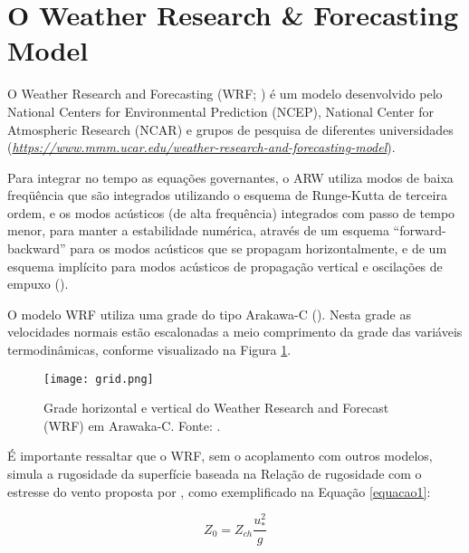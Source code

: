 
\section{O Weather Research \& Forecasting Model}
\bigskip

\noindent O Weather Research and Forecasting (WRF; \cite{Skamarock2008}) é um modelo desenvolvido pelo National Centers for Environmental Prediction (NCEP), National Center for Atmospheric Research (NCAR) e grupos de pesquisa de diferentes universidades (\textcolor{bleu_cite}{\href{https://www.mmm.ucar.edu/weather-research-and-forecasting-model}{\textit{https://www.mmm.ucar.edu/weather-research-and-forecasting-model}}}).
\bigskip

\noindent Para integrar no tempo as equações governantes, o ARW utiliza modos de baixa freqüência que são integrados utilizando o esquema de Runge-Kutta de terceira ordem, e os modos acústicos (de alta frequência) integrados com passo de tempo menor, para manter a estabilidade numérica, através de um esquema “forward-backward” para os modos acústicos que se propagam horizontalmente, e de um esquema implícito para modos acústicos de propagação vertical e oscilações de empuxo (\cite{Skamarock2008}).
\bigskip

\noindent O modelo WRF utiliza uma grade do tipo Arakawa-C (\cite{Arakawa1977}). Nesta grade as velocidades normais estão escalonadas a meio comprimento da grade das variáveis termodinâmicas, conforme visualizado na Figura \textcolor{bleu_cite}{\ref{gradeswrf}}.
\bigskip


\begin{figure}[H]
    \centering
    \captionsetup{justification=centering}
    \texttt{[image: grid.png]}
    \centering \caption{Grade horizontal e vertical do Weather Research and Forecast (WRF) em Arawaka-C. \newline Fonte: \textcite{Skamarock2008}.}
    \label{gradeswrf}
\end{figure}
\bigskip

\noindent É importante ressaltar que o WRF, sem o acoplamento com outros modelos, simula a rugosidade da superfície baseada na Relação de rugosidade com o estresse do vento proposta por \textcite{Charnock1955}, como exemplificado na Equação \textcolor{bleu_cite}{\ref{equacao1}}:
\bigskip

\begin{equation}
Z_{0} = Z_{ch} \frac{u_{*}^{2}}{g}
\label{equacao1}
\end{equation}

